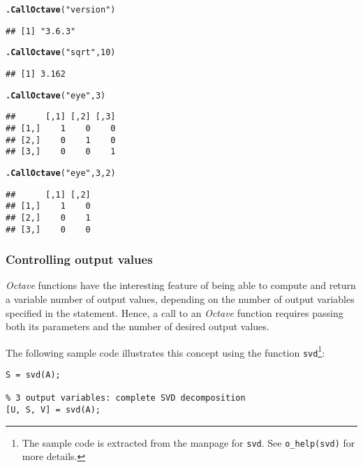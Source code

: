 \documentclass[english,10pt,a4paper]{article}\usepackage{graphicx, color}
\makeatletter
\newcommand{\hlfunctioncall}[1]{\textcolor[rgb]{0.501960784313725,0,0.329411764705882}{\textbf{#1}}}%
\newcommand{\hlstring}[1]{\textcolor[rgb]{0.6,0.6,1}{#1}}%
\newenvironment{kframe}{%
 \def\at@end@of@kframe{}%
 \ifinner\ifhmode%
  \def\at@end@of@kframe{\end{minipage}}%
  \begin{minipage}{\columnwidth}%
 \fi\fi%
 \def\FrameCommand##1{\hskip\@totalleftmargin \hskip-\fboxsep
 \colorbox{shadecolor}{##1}\hskip-\fboxsep
     \hskip-\linewidth \hskip-\@totalleftmargin \hskip\columnwidth}%
 \MakeFramed {\advance\hsize-\width
   \@totalleftmargin\z@ \linewidth\hsize
   \@setminipage}}%
 {\par\unskip\endMakeFramed%
 \at@end@of@kframe}
\newenvironment{knitrout}{}{} %
\let\proglang=\textit
\let\code=\texttt
\newcommand{\octave}{\proglang{Octave}\xspace}
\makeatother
\begin{document}
\begin{knitrout}
\color{fgcolor}\begin{kframe}
\begin{alltt}
\hlfunctioncall{.CallOctave}(\hlstring{"version"})
\end{alltt}
\begin{verbatim}
## [1] "3.6.3"
\end{verbatim}
\begin{alltt}
\hlfunctioncall{.CallOctave}(\hlstring{"sqrt"}, 10)
\end{alltt}
\begin{verbatim}
## [1] 3.162
\end{verbatim}
\begin{alltt}
\hlfunctioncall{.CallOctave}(\hlstring{"eye"}, 3)
\end{alltt}
\begin{verbatim}
##      [,1] [,2] [,3]
## [1,]    1    0    0
## [2,]    0    1    0
## [3,]    0    0    1
\end{verbatim}
\begin{alltt}
\hlfunctioncall{.CallOctave}(\hlstring{"eye"}, 3, 2)
\end{alltt}
\begin{verbatim}
##      [,1] [,2]
## [1,]    1    0
## [2,]    0    1
## [3,]    0    0
\end{verbatim}
\end{kframe}
\end{knitrout}


\subsubsection{Controlling output values}
\label{sec:argout}

\octave functions have the interesting feature of being able to compute
and return a variable number of output values, depending on the number of output
variables specified in the statement.
Hence, a call to an \octave function requires passing both its parameters and
the number of desired output values.

The following sample code illustrates this concept using the function
\code{svd}\footnote{The sample code is extracted from the manpage for
\code{svd}. See \code{o\_help(svd)} for more details.}:

\begin{Verbatim}[frame=single]
% single output variable: eigen values only
S = svd(A);

% 3 output variables: complete SVD decomposition  
[U, S, V] = svd(A);
\end{Verbatim}
\end{document}
